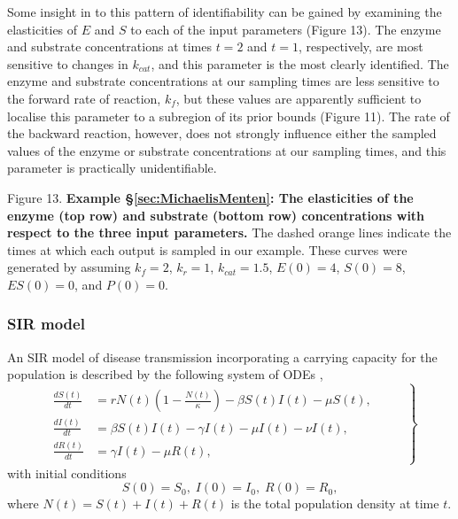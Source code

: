 \documentclass[10pt,letterpaper]{article}
\begin{document}
\vspace{0.5cm}

Some insight in to this pattern of identifiability can be gained by examining the elasticities of $E$ and $S$ to each of the input parameters (Figure 13). The enzyme and substrate concentrations at times $t=2$ and $t=1$, respectively, are most sensitive to changes in $k_{cat}$, and this parameter is the most clearly identified. The enzyme and substrate concentrations at our sampling times are less sensitive to the forward rate of reaction, $k_f$, but these values are apparently sufficient to localise this parameter to a subregion of its prior bounds (Figure 11). The rate of the backward reaction, however, does not strongly influence either the sampled values of the enzyme or substrate concentrations at our sampling times, and this parameter is practically unidentifiable.

\vspace{0.5cm}

Figure 13. {\bf Example \S \ref{sec:MichaelisMenten}: The elasticities of the enzyme (top row) and substrate (bottom row) concentrations with respect to the three input parameters.} The dashed orange lines indicate the times at which each output is sampled in our example. These curves were generated by assuming $k_f = 2$, $k_r = 1$, $k_{cat} = 1.5$, $E(0) = 4$, $S(0) = 8$, $ES(0) = 0$, and $P(0) = 0$.

\vspace{0.5cm}

\subsubsection{SIR model}
\label{sec:SIR}

An SIR model of disease transmission incorporating a carrying capacity for the population is described by the following system of ODEs \cite{tavener2011transient},
%
\begin{equation}
\left .
\begin{gathered}\begin{aligned}
\frac{dS(t)}{dt} &= r N(t) \left(1 - \frac{N(t)}{\kappa}\right) - \beta S(t) I(t) - \mu S(t),\\
\frac{dI(t)}{dt} &= \beta S(t) I(t) - \gamma I(t) - \mu I(t) - \nu I(t),\\
\frac{dR(t)}{dt} &= \gamma I(t) - \mu R(t),
\end{aligned}\end{gathered}
\qquad \right\}
\end{equation}
with initial conditions
\begin{equation}
S(0)= S_0, \; I(0)=I_0, \; R(0)=R_0,
\end{equation}
%
where $N(t) = S(t) + I(t) + R(t)$ is the total population density at time $t$.
\end{document}

